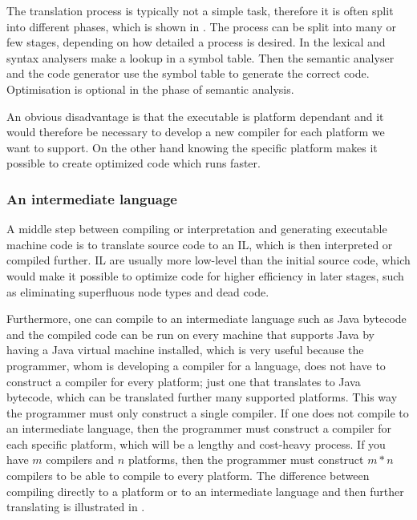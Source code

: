 The translation process is typically not a simple task, therefore
it is often split into different phases, which is shown in
. The process can be split into many
or few stages, depending on how detailed a process is desired. In
 the lexical and syntax analysers make
a lookup in a symbol table. Then the semantic analyser and the
code generator use the symbol table to generate the correct code.
Optimisation is optional in the phase of semantic analysis. \cite[p.
46]{sebesta2013}



An obvious disadvantage is that the executable is platform dependant
and it would therefore be necessary to develop a new compiler for each
platform we want to support. On the other hand knowing the specific
platform makes it possible to create optimized code which runs faster.

\subsubsection{An intermediate language}
\label{sec:intermediatelanguage}
A middle step between compiling or interpretation and generating
executable machine code is to translate source code to an IL, which is
then interpreted or compiled further. IL are usually more low-level than
the initial source code, which would make it possible to optimize code
for higher efficiency in later stages, such as eliminating superfluous
node types and dead code.

Furthermore, one can compile to an intermediate language such as Java
bytecode and the compiled code can be run on every machine that supports
Java by having a Java virtual machine installed, which is very useful
because the programmer, whom is developing a compiler for a language,
does not have to construct a compiler for every platform; just one
that translates to Java bytecode, which can be translated further many
supported platforms. This way the programmer must only construct a
single compiler. If one does not compile
to an intermediate language, then the programmer must construct a
compiler for each specific platform, which will be a lengthy and
cost-heavy process. If you have $m$ compilers and $n$ platforms, then
the programmer must construct $m*n$ compilers to be able to compile
to every platform. The difference between compiling directly to a
platform or to an intermediate language and then further translating is
illustrated in .

